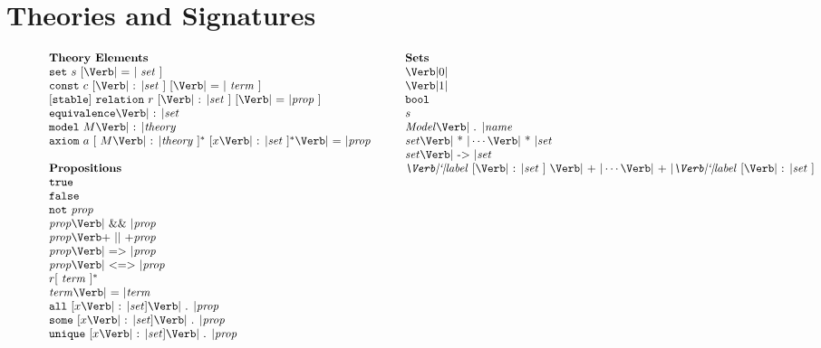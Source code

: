 
\section{Theories and Signatures}
\label{sec:theories-signatures}

\begin{figure*}[t]
\[
\begin{array}[t]{l}
\mbox{\textbf{Theory Elements}}\\
\SET\ s\ [\EQUALS\ \mathit{set}\ ]\\
\CONST\ c\ [\COLON \mathit{set}\ ]\ [\EQUALS\ \mathit{term}\ ]\\
{}[\STABLE{}]\ \RELATION\ r\ [\COLON \mathit{set}\ ]\ [\EQUALS \mathit{prop}\ ]\\
\EQUIVALENCE \COLON \mathit{set}\\
\MODEL\ M\COLON\mathit{theory}\\
\AXIOM\ a\ [\ M\COLON\mathit{theory}\ ]^{*}\ [x\COLON\mathit{set}\ ]^*\EQUALS\mathit{prop}\\
\\
\mbox{\textbf{Propositions}}\\
\TRUE\\
\FALSE\\
\NOT\ \Prop\\
\Prop \AAND \Prop\\
\Prop \OOR \Prop\\
\Prop \IIMPLY \Prop\\
\Prop \IIFF \Prop\\
r [\ \Term\ ]^*\\
\Term\EQUALS\Term\\ %
\ALL\ [x\COLON \Set] \PERIOD \Prop\\
\SOME\ [x\COLON \Set] \PERIOD \Prop\\
\UNIQUE\ [x\COLON \Set] \PERIOD \Prop\\
\end{array}
\qquad
\begin{array}[t]{l}
\mbox{\textbf{Sets}}\\
\ZERO\\
\ONE\\
\BOOL\\
s\\
\mathit{Model}\PERIOD \mathit{name}\\
\Set \TIMES \cdots \TIMES \Set\\
\Setexp \ARROW \Setexp\\
\Label\ [\COLON \Setexp\ ]\ \PLUS \cdots \PLUS \Label\ [\COLON \Setexp\ ]\\

\end{array}\]
\end{figure*}
